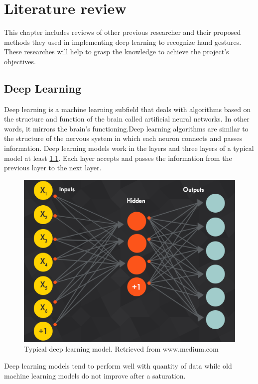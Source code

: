 \documentclass[12pt]{report}
\begin{document}
\chapter{Literature review}

This chapter includes reviews of other previous researcher
and their proposed methods they used in implementing deep learning
to recognize hand gestures. These researches will help to grasp the knowledge
to achieve the project's objectives. 

\section{Deep Learning}
Deep learning is a machine learning subfield that deals with algorithms based 
on the structure and function of the brain called artificial neural networks. 
In other words, it mirrors the brain's functioning.Deep learning algorithms 
are similar to the structure of the nervous system in which each neuron connects
and passes information. Deep learning models work in the layers and three layers 
of a typical model at least \ref{fig:deep_learining}. Each layer accepts and passes
the information from the previous layer to the next layer.

\begin{figure} [h]
    \centering
    \includegraphics[width=\textwidth]{./images/deep_learning.png}
    \caption{Typical deep learning model. Retrieved from www.medium.com}
    \label{fig:deep_learining}
\end{figure}

Deep learning models tend to perform well with quantity of data while 
old machine learning models do not improve after a saturation.
\end{document}
